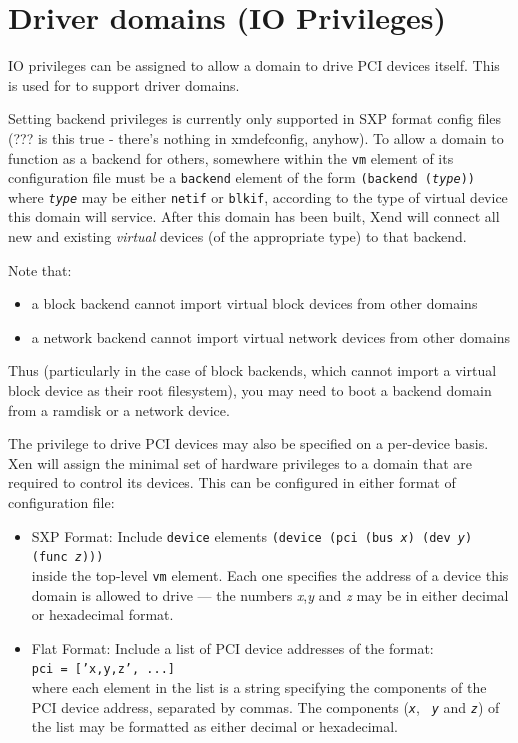 \documentclass[11pt,twoside,final,openright]{xenstyle}
\begin{document}
{\section{Driver domains (IO Privileges)}

IO privileges can be assigned to allow a domain to drive PCI devices
itself.  This is used for to support driver domains.

Setting backend privileges is currently only supported in SXP format
config files (??? is this true - there's nothing in xmdefconfig,
anyhow).  To allow a domain to function as a backend for others,
somewhere within the {\tt vm} element of its configuration file must
be a {\tt backend} element of the form {\tt (backend ({\em type}))}
where {\tt \em type} may be either {\tt netif} or {\tt blkif},
according to the type of virtual device this domain will service.
After this domain has been built, Xend will connect all new and
existing {\em virtual} devices (of the appropriate type) to that
backend.

Note that:
\begin{itemize}
\item a block backend cannot import virtual block devices from other
domains
\item a network backend cannot import virtual network devices from
other domains
\end{itemize}

Thus (particularly in the case of block backends, which cannot import
a virtual block device as their root filesystem), you may need to boot
a backend domain from a ramdisk or a network device.

The privilege to drive PCI devices may also be specified on a
per-device basis.  Xen will assign the minimal set of hardware
privileges to a domain that are required to control its devices.  This
can be configured in either format of configuration file:

\begin{itemize}
\item SXP Format:
  Include {\tt device} elements
  {\tt (device (pci (bus {\em x}) (dev {\em y}) (func {\em z}))) } \\
  inside the top-level {\tt vm} element.  Each one specifies the address
  of a device this domain is allowed to drive ---
  the numbers {\em x},{\em y} and {\em z} may be in either decimal or
  hexadecimal format.
\item Flat Format: Include a list of PCI device addresses of the
  format: \\ {\tt pci = ['x,y,z', ...] } \\ where each element in the
  list is a string specifying the components of the PCI device
  address, separated by commas.  The components ({\tt \em x}, {\tt \em
  y} and {\tt \em z}) of the list may be formatted as either decimal
  or hexadecimal.
\end{itemize}

}
\end{document}
